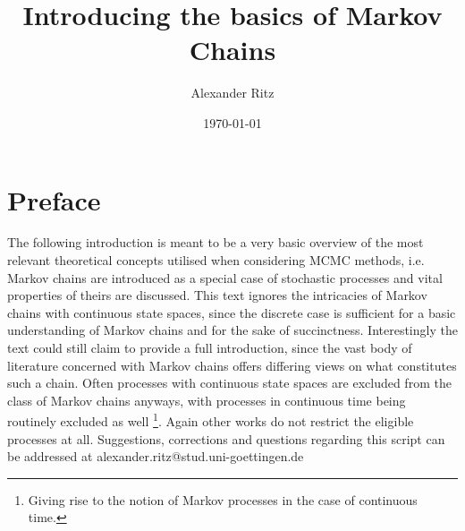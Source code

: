 \documentclass[12pt]{article}
\title{Introducing the basics of Markov Chains}
\author{Alexander Ritz}
\date{\today}
\begin{document}
\maketitle


\section{Preface}
The following introduction is meant to be a very basic overview of the most relevant theoretical concepts utilised when considering MCMC methods, i.e. Markov chains are introduced as a special case of stochastic processes and vital properties of theirs are discussed. This text ignores the intricacies of Markov chains with continuous state spaces, since the discrete case is sufficient for a basic understanding of Markov chains and for the sake of succinctness. Interestingly the text could still claim to provide a full introduction, since the vast body of literature concerned with Markov chains offers differing views on what constitutes such a chain. Often processes with continuous state spaces are excluded from the class of Markov chains anyways, with processes in continuous time being routinely excluded as well \footnote{Giving rise to the notion of Markov processes in the case of continuous time.}. Again other works do not restrict the eligible processes at all.
\newline
Suggestions, corrections and questions regarding this script can be addressed at alexander.ritz@stud.uni-goettingen.de
\newpage
\end{document}
